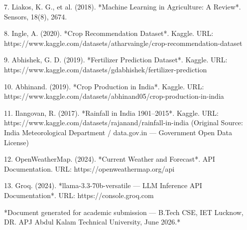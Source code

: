 \documentclass[12pt,a4paper]{report}
\begin{document}
7. Liakos, K. G., et al. (2018). *Machine Learning in Agriculture: A Review*. Sensors, 18(8), 2674.

8. Ingle, A. (2020). *Crop Recommendation Dataset*. Kaggle.
URL: https://www.kaggle.com/datasets/atharvaingle/crop-recommendation-dataset

9. Abhishek, G. D. (2019). *Fertilizer Prediction Dataset*. Kaggle.
URL: https://www.kaggle.com/datasets/gdabhishek/fertilizer-prediction

10. Abhinand. (2019). *Crop Production in India*. Kaggle.
URL: https://www.kaggle.com/datasets/abhinand05/crop-production-in-india

11. Ilangovan, R. (2017). *Rainfall in India 1901–2015*. Kaggle.
URL: https://www.kaggle.com/datasets/rajanand/rainfall-in-india
(Original Source: India Meteorological Department / data.gov.in — Government Open Data License)

12. OpenWeatherMap. (2024). *Current Weather and Forecast*. API Documentation.
URL: https://openweathermap.org/api

13. Groq. (2024). *llama-3.3-70b-versatile — LLM Inference API Documentation*.
URL: https://console.groq.com

\newpage

*Document generated for academic submission — B.Tech CSE, IET Lucknow, DR. APJ Abdul Kalam Technical University, June 2026.*
\end{document}
